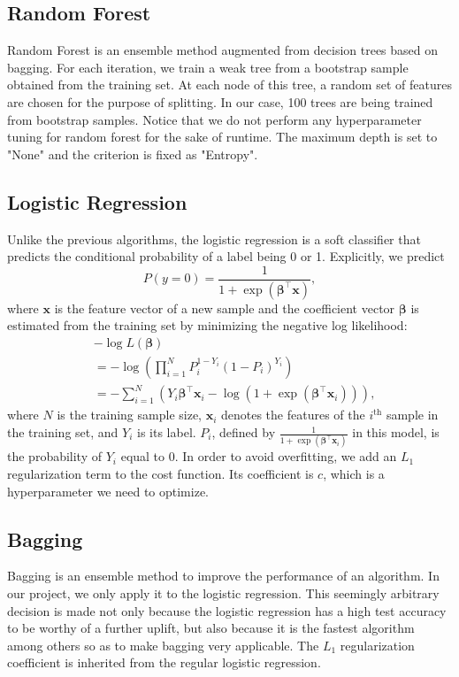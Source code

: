 \documentclass[10pt,twocolumn,letterpaper]{article}
\begin{document}
	\subsection{Random Forest}
	Random Forest is an ensemble method augmented from decision trees based on bagging. For each iteration, we train a weak tree from a bootstrap sample obtained from the training set. At each node of this tree, a random set of features are chosen for the purpose of splitting. In our case, 100 trees are being trained from bootstrap samples. Notice that we do not perform any hyperparameter tuning for random forest for the sake of runtime. The maximum depth is set to "None" and the criterion is fixed as "Entropy".
	\subsection{Logistic Regression}
	Unlike the previous algorithms, the logistic regression is a soft classifier that predicts the conditional probability of a label being 0 or 1. Explicitly, we predict
	$$P(y = 0) = \frac{1}{1+\exp(\bm{\beta^\top}\bm{x})},$$ where $\bm{x}$ is the feature vector of a new sample and the coefficient vector $\bm{\beta}$ is estimated from the training set by minimizing the negative log likelihood: \begin{align*}
	&-\log L(\bm{\beta}) \\
	&= -\log (\prod_{i=1}^{N}P_i^{1-Y_i}(1-P_i)^{Y_i})\\
	&= -\sum_{i=1}^{N}(Y_i\bm{\beta}^\top\bm{x}_i - \log(1+\exp(\bm{\beta}^\top\bm{x}_i))),
	\end{align*} 
	where $N$ is the training sample size, $\bm{x}_i$ denotes the features of the $i^\text{th}$ sample in the training set, and $Y_i$ is its label. $P_i$, defined by $\frac{1}{1+\exp(\bm{\beta^\top}\bm{x}_i)}$ in this model, is the probability of $Y_i$ equal to $0$.
	In order to avoid overfitting, we add an $L_1$ regularization term to the cost function. Its coefficient is $c$, which is a hyperparameter we need to optimize.
	\subsection{Bagging}
	Bagging is an ensemble method to improve the performance of an algorithm. In our project, we only apply it to the logistic regression. This seemingly arbitrary decision is made not only because the logistic regression has a high test accuracy to be worthy of a further uplift, but also because it is the fastest algorithm among others so as to make bagging very applicable. The $L_1$ regularization coefficient is inherited from the regular logistic regression. 
	
\end{document}
